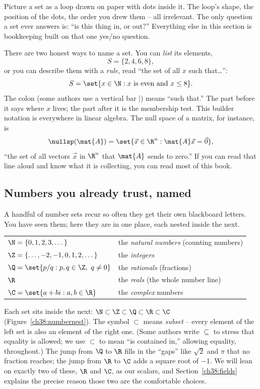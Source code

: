 \begin{intuitionbox}
Picture a set as a loop drawn on paper with dots inside it. The loop's shape, the
position of the dots, the order you drew them -- all irrelevant. The only question a set
ever answers is: ``is this thing in, or out?'' Everything else in this section is
bookkeeping built on that one yes/no question.
\end{intuitionbox}

There are two honest ways to name a set. You can \emph{list} its elements,
\[
  S = \{2, 4, 6, 8\},
\]
or you can describe them with a \emph{rule}, read ``the set of all $x$ such that\ldots'':
\[
  S = \set{x \in \N : x \text{ is even and } x \le 8}.
\]
The colon (some authors use a vertical bar $\mid$) means ``such that.'' The part before
it says where $x$ lives; the part after it is the membership test. This builder notation
is everywhere in linear algebra. The null space of a matrix, for instance, is
\[
  \nullsp(\mat{A}) = \set{\vec{x} \in \R^n : \mat{A}\vec{x} = \vec{0}},
\]
``the set of all vectors $\vec{x}$ in $\R^n$ that $\mat{A}$ sends to zero.'' If you can
read that line aloud and know what it is collecting, you can read most of this book.

\subsection{Numbers you already trust, named}

A handful of number sets recur so often they get their own blackboard letters. You have
seen them; here they are in one place, each nested inside the next.

\begin{center}
\begin{tabular}{ll}
\toprule
$\N = \{0, 1, 2, 3, \dots\}$ & the \emph{natural numbers} (counting numbers) \\
$\Z = \{\dots, -2, -1, 0, 1, 2, \dots\}$ & the \emph{integers} \\
$\Q = \set{p/q : p,q \in \Z,\ q \ne 0}$ & the \emph{rationals} (fractions) \\
$\R$ & the \emph{reals} (the whole number line) \\
$\C = \set{a + bi : a,b \in \R}$ & the \emph{complex} numbers \\
\bottomrule
\end{tabular}
\end{center}

Each set sits inside the next: $\N \subset \Z \subset \Q \subset \R \subset \C$
(Figure~\ref{ch38:numbernest}). The
symbol $\subset$ means \emph{subset} -- every element of the left set is also an element
of the right one. (Some authors write $\subseteq$ to stress that equality is allowed; we
use $\subset$ to mean ``is contained in,'' allowing equality, throughout.) The jump from
$\Q$ to $\R$ fills in the ``gaps'' like $\sqrt{2}$ and $\pi$ that no fraction reaches; the
jump from $\R$ to $\C$ adds a square root of $-1$. We will lean on exactly two of these,
$\R$ and $\C$, as our scalars, and Section~\ref{ch38:fields} explains the precise reason
those two are the comfortable choices.

